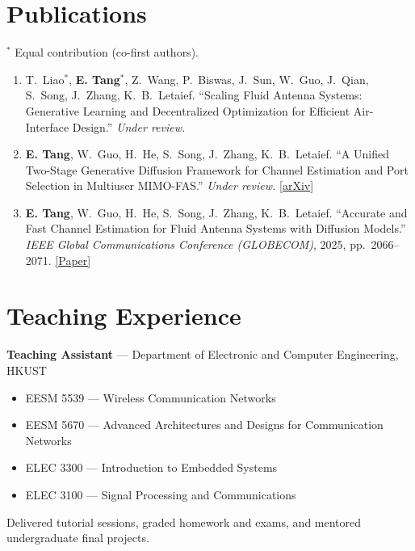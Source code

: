 \documentclass[10pt,a4paper]{article}
\newcommand{\me}{\textbf{E. Tang}}
\newcommand{\entry}[2]{%
  \noindent\begin{minipage}[t]{0.78\textwidth}#1\end{minipage}%
  \hfill\begin{minipage}[t]{0.20\textwidth}\raggedleft{\color{muted}\small #2}\end{minipage}\par}
\begin{document}
\section{Publications}
{\color{muted}\small $^{*}$ Equal contribution (co-first authors).}
\begin{enumerate}[leftmargin=1.4em, label=\arabic*., itemsep=6pt]
  \item T.\ Liao$^{*}$, \me$^{*}$, Z.\ Wang, P.\ Biswas, J.\ Sun, W.\ Guo, J.\ Qian, S.\ Song,
        J.\ Zhang, K.\ B.\ Letaief.
        ``Scaling Fluid Antenna Systems: Generative Learning and Decentralized Optimization
        for Efficient Air-Interface Design.''
        \textit{Under review.}
  \item \me, W.\ Guo, H.\ He, S.\ Song, J.\ Zhang, K.\ B.\ Letaief.
        ``A Unified Two-Stage Generative Diffusion Framework for Channel Estimation and Port
        Selection in Multiuser MIMO-FAS.''
        \textit{Under review.}
        \href{https://arxiv.org/abs/2605.29679}{[arXiv]}
  \item \me, W.\ Guo, H.\ He, S.\ Song, J.\ Zhang, K.\ B.\ Letaief.
        ``Accurate and Fast Channel Estimation for Fluid Antenna Systems with Diffusion Models.''
        \textit{IEEE Global Communications Conference (GLOBECOM)}, 2025, pp.\ 2066--2071.
        \href{https://doi.org/10.1109/GLOBECOM59602.2025.11432492}{[Paper]}
\end{enumerate}

\section{Teaching Experience}
\entry{%
  \textbf{Teaching Assistant} --- Department of Electronic and Computer Engineering, HKUST%
}{2022 -- 2023}
\begin{itemize}
  \item EESM 5539 --- Wireless Communication Networks
  \item EESM 5670 --- Advanced Architectures and Designs for Communication Networks
  \item ELEC 3300 --- Introduction to Embedded Systems
  \item ELEC 3100 --- Signal Processing and Communications
\end{itemize}
\vspace{2pt}
Delivered tutorial sessions, graded homework and exams, and mentored undergraduate final projects.

\end{document}
